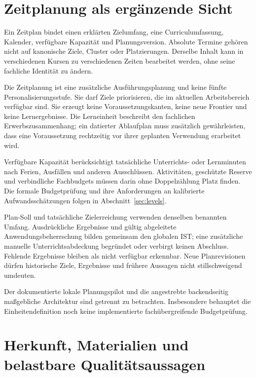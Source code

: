 \section{Zeitplanung als ergänzende Sicht}
\label{sec:time-context}

Ein Zeitplan bindet einen erklärten Zielumfang, eine Curriculumfassung,
Kalender, verfügbare Kapazität und Planungsversion. Absolute Termine
gehören nicht auf kanonische Ziele, Cluster oder Platzierungen.
Derselbe Inhalt kann in verschiedenen Kursen zu verschiedenen
Zeiten bearbeitet werden, ohne seine fachliche Identität zu ändern.

Die Zeitplanung ist eine zusätzliche Ausführungsplanung und keine
fünfte Personalisierungsstufe. Sie darf Ziele priorisieren, die im
aktuellen Arbeitsbereich verfügbar sind. Sie erzeugt keine
Voraussetzungskanten, keine neue Frontier und keine Lernergebnisse.
Die Lerneinheit beschreibt den fachlichen Erwerbszusammenhang; ein datierter
Ablaufplan muss zusätzlich gewährleisten, dass eine Voraussetzung
rechtzeitig vor ihrer geplanten Verwendung erarbeitet wird.

Verfügbare Kapazität berücksichtigt tatsächliche Unterrichts- oder
Lernminuten nach Ferien, Ausfällen und anderen Ausschlüssen.
Aktivitäten, geschützte Reserve und verbindliche Fachbudgets
müssen darin ohne Doppelzählung Platz finden. Die formale
Budgetprüfung und ihre Anforderungen an kalibrierte
Aufwandsschätzungen folgen in Abschnitt~\ref{sec:levels}.

Plan-Soll und tatsächliche Zielerreichung verwenden denselben
benannten Umfang. Ausdrückliche Ergebnisse und gültig abgeleitete
Anwendungsbeherrschung bilden gemeinsam den globalen IST; eine zusätzliche
manuelle Unterrichtsabdeckung begründet oder verbirgt keinen Abschluss.
Fehlende Ergebnisse bleiben als nicht verfügbar erkennbar.
Neue Planrevisionen dürfen historische Ziele, Ergebnisse und
frühere Aussagen nicht stillschweigend umdeuten.

Der dokumentierte lokale Planungspilot und die angestrebte
backendseitig maßgebliche Architektur sind getrennt zu betrachten.
Insbesondere behauptet die Einheitendefinition noch keine
implementierte fachübergreifende Budgetprüfung.


\section{Herkunft, Materialien und belastbare Qualitätsaussagen}
\label{sec:evidence-context}

